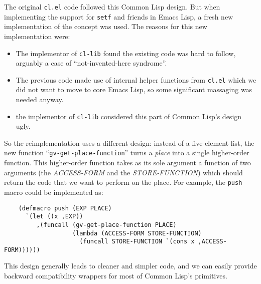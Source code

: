 \documentclass[format=acmsmall, review]{acmart}
\newcommand \Elisp {Emacs Lisp}
\begin{document}
The original \texttt{cl.el} code followed this Common Lisp design.  But when
implementing the support for \texttt{setf} and friends in \Elisp{}, a fresh
new implementation of the concept was used.  The reasons for this new
implementation were:
\begin{itemize}
\item The implementor of \texttt{cl-lib} found the existing code was hard
  to follow, arguably a case of ``not-invented-here syndrome''.
\item The previous code made use of internal helper functions from
  \texttt{cl.el} which we did not want to move to core \Elisp, so some
  significant massaging was needed anyway.
\item the implementor of \texttt{cl-lib} considered this part of Common Lisp's
  design ugly.
\end{itemize}
So the reimplementation uses a different design: instead of a five element
list, the new function ``\texttt{gv-get-place-function}'' turns
a \emph{place}  into a single higher-order function.
This higher-order function takes as its sole argument a function
of two arguments (the \textsl{ACCESS-FORM} and the \textsl{STORE-FUNCTION})
which should return the code that we want to perform on the place.
For example, the \texttt{push} macro could be implemented as:
\begin{verbatim}
    (defmacro push (EXP PLACE)
      `(let ((x ,EXP))
         ,(funcall (gv-get-place-function PLACE)
                   (lambda (ACCESS-FORM STORE-FUNCTION)
                     (funcall STORE-FUNCTION `(cons x ,ACCESS-FORM))))))
\end{verbatim}
This design generally leads to cleaner and simpler code, and we can easily
provide backward compatibility wrappers for most of Common Lisp's
primitives.
\end{document}
